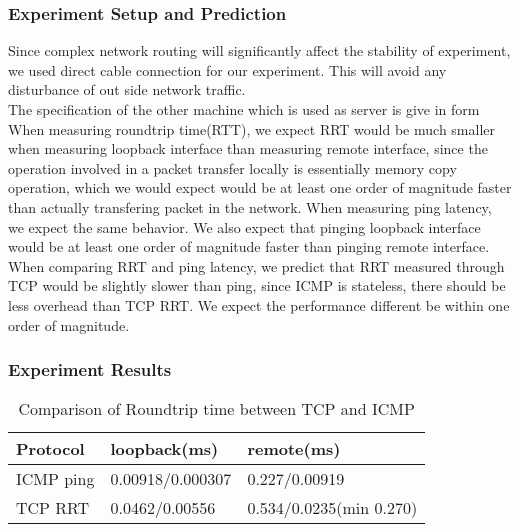 \documentclass{article} %
\begin{document}
\subsubsection{Experiment Setup and Prediction}
Since complex network routing will significantly affect the stability of experiment, we used direct cable connection for our experiment. This will avoid any disturbance of out side network traffic. \\
The specification of the other machine which is used as server is give in form \\ %
When measuring roundtrip time(RTT), we expect RRT would be much smaller when measuring loopback interface than measuring remote interface, since the operation involved in a packet transfer locally is essentially memory copy operation, which we would expect would be at least one order of magnitude faster than actually transfering packet in the network. When measuring ping latency, we expect the same behavior. We also expect that pinging loopback interface would be at least one order of magnitude faster than pinging remote interface. \\
When comparing RRT and ping latency, we predict that RRT measured through TCP would be slightly slower than ping, since ICMP is stateless, there should be less overhead than TCP RRT. We expect the performance different be within one order of magnitude.\\
\subsubsection{Experiment Results}

\begin{table}
  \begin{center}
    \caption{Comparison of Roundtrip time between TCP and ICMP}
    \begin{tabular}{|l|l|l|}
      \hline
      Protocol  & loopback(ms)     & remote(ms)              \\ \hline
      ICMP ping & 0.00918/0.000307 & 0.227/0.00919           \\ \hline
      TCP RRT   & 0.0462/0.00556   & 0.534/0.0235(min 0.270) \\ \hline
    \end{tabular}
    \label{table:roundtrip}
  \end{center}
\end{table}
\end{document}
